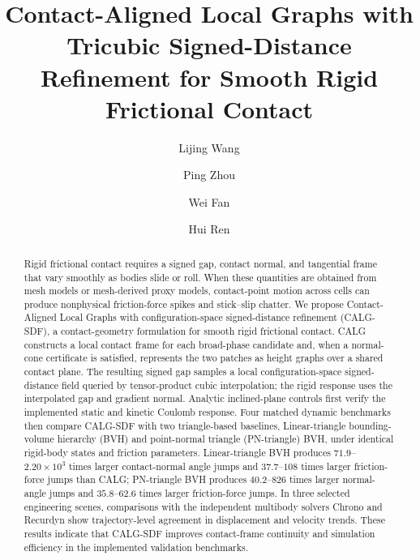 \documentclass[preprint,12pt]{elsarticle}
\begin{document}
\begin{frontmatter}

\title{Contact-Aligned Local Graphs with Tricubic Signed-Distance Refinement for Smooth Rigid Frictional Contact}

\author[1]{Lijing Wang}
\author[2,3]{Ping Zhou}
\author[2,3]{Wei Fan}
\author[1,2,3]{Hui Ren\texorpdfstring{}{}}





\begin{abstract}
Rigid frictional contact requires a signed gap, contact normal, and tangential frame that vary smoothly as bodies slide or roll. When these quantities are obtained from mesh models or mesh-derived proxy models, contact-point motion across cells can produce nonphysical friction-force spikes and stick--slip chatter. We propose Contact-Aligned Local Graphs with configuration-space signed-distance refinement (CALG-SDF), a contact-geometry formulation for smooth rigid frictional contact. CALG constructs a local contact frame for each broad-phase candidate and, when a normal-cone certificate is satisfied, represents the two patches as height graphs over a shared contact plane. The resulting signed gap samples a local configuration-space signed-distance field queried by tensor-product cubic interpolation; the rigid response uses the interpolated gap and gradient normal. Analytic inclined-plane controls first verify the implemented static and kinetic Coulomb response. Four matched dynamic benchmarks then compare CALG-SDF with two triangle-based baselines, Linear-triangle bounding-volume hierarchy (BVH) and point-normal triangle (PN-triangle) BVH, under identical rigid-body states and friction parameters. Linear-triangle BVH produces $71.9$--$2.20\times10^3$ times larger contact-normal angle jumps and $37.7$--$108$ times larger friction-force jumps than CALG; PN-triangle BVH produces $40.2$--$826$ times larger normal-angle jumps and $35.8$--$62.6$ times larger friction-force jumps. In three selected engineering scenes, comparisons with the independent multibody solvers Chrono and Recurdyn show trajectory-level agreement in displacement and velocity trends. These results indicate that CALG-SDF improves contact-frame continuity and simulation efficiency in the implemented validation benchmarks.
\end{abstract}


\end{frontmatter}
\end{document}
